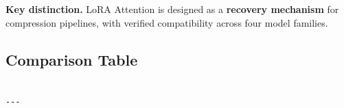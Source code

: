 \textbf{Key distinction.} LoRA Attention is designed as a \textbf{recovery mechanism} 
for compression pipelines, with verified compatibility across four model 
families.



\subsection{Comparison Table}

\begin{lstlisting}

---
\end{lstlisting}